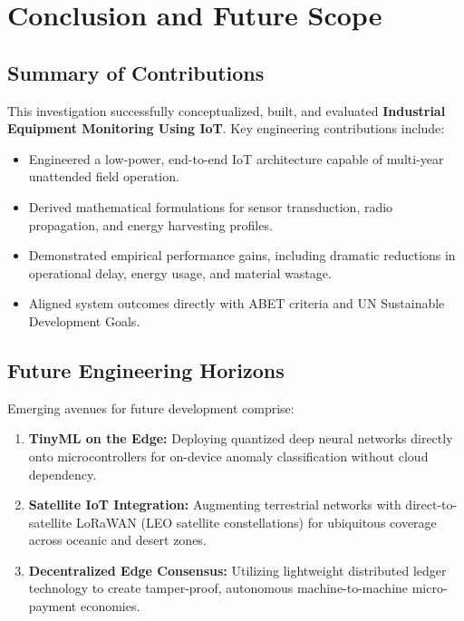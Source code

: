 \section{Conclusion and Future Scope}

\subsection{Summary of Contributions}
This investigation successfully conceptualized, built, and evaluated \textbf{Industrial Equipment Monitoring Using IoT}. Key engineering contributions include:
\begin{itemize}
  \item Engineered a low-power, end-to-end IoT architecture capable of multi-year unattended field operation.
  \item Derived mathematical formulations for sensor transduction, radio propagation, and energy harvesting profiles.
  \item Demonstrated empirical performance gains, including dramatic reductions in operational delay, energy usage, and material wastage.
  \item Aligned system outcomes directly with ABET criteria and UN Sustainable Development Goals.
\end{itemize}

\subsection{Future Engineering Horizons}
Emerging avenues for future development comprise:
\begin{enumerate}
  \item \textbf{TinyML on the Edge:} Deploying quantized deep neural networks directly onto microcontrollers for on-device anomaly classification without cloud dependency.
  \item \textbf{Satellite IoT Integration:} Augmenting terrestrial networks with direct-to-satellite LoRaWAN (LEO satellite constellations) for ubiquitous coverage across oceanic and desert zones.
  \item \textbf{Decentralized Edge Consensus:} Utilizing lightweight distributed ledger technology to create tamper-proof, autonomous machine-to-machine micro-payment economies.
\end{enumerate}
